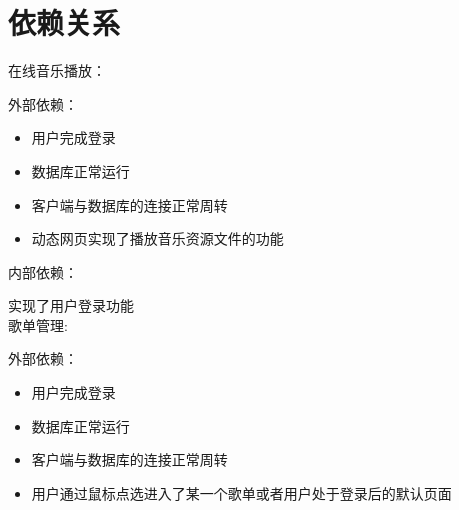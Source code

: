 \chapter{依赖关系}
  
  
   
  
  
   在线音乐播放：
  
   
  
   
  
   外部依赖：
  
            \begin{itemize}
        
            \item 用户完成登录
        
            \item 数据库正常运行
        
            \item 客户端与数据库的连接正常周转
        
            \item 动态网页实现了播放音乐资源文件的功能
        
        
        
        \end{itemize}
  
   
  
   
  
   内部依赖：
  
   实现了用户登录功能\\

  
   歌单管理:
  
   
  
   外部依赖：
    
    \begin{itemize}
    
    
    
        \item 用户完成登录
    
        \item 数据库正常运行
    
        \item 客户端与数据库的连接正常周转
    
        \item 用户通过鼠标点选进入了某一个歌单或者用户处于登录后的默认页面
    
    \end{itemize}
  
